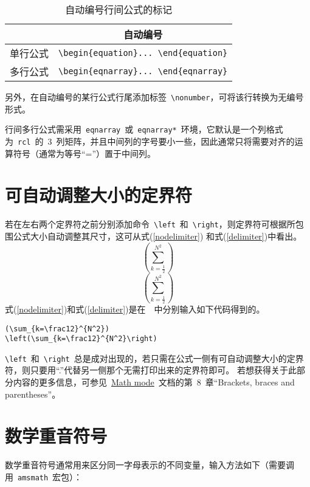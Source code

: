 \begin{table}[htbp]
\caption{自动编号行间公式的标记}\label{tab:eqtag_2}
\vspace{0.5em}\centering\wuhao
\begin{tabularx}{\textwidth}{cc}
\toprule
& 自动编号\\
\midrule
单行公式 & \verb|\begin{equation}... \end{equation}|\\
多行公式 & \verb|\begin{eqnarray}... \end{eqnarray}|\\
\bottomrule
\end{tabularx}
\end{table}

另外，在自动编号的某行公式行尾添加标签~\verb|\nonumber|，可将该行转换为无编号形式。

行间多行公式需采用~\verb|eqnarray|~或~\verb|eqnarray*|~环境，它默认是一个列格式为~\verb|rcl|~的~3~列矩阵，并且中间列的字号要小一些，因此通常只将需要对齐的运算符号（通常为等号“=”）置于中间列。

\section{可自动调整大小的定界符}

若在左右两个定界符之前分别添加命令~\verb|\left|~和~\verb|\right|，则定界符可根据所包围公式大小自动调整其尺寸，这可从式(\ref{nodelimiter}) 和式(\ref{delimiter})中看出。
\begin{equation}\label{nodelimiter}
(\sum_{k=\frac12}^{N^2})
\end{equation}
\begin{equation}\label{delimiter}
\left(\sum_{k=\frac12}^{N^2}\right)
\end{equation}
式(\ref{nodelimiter})和式(\ref{delimiter})是在~\XeLaTeX~中分别输入如下代码得到的。
\begin{verbatim}
(\sum_{k=\frac12}^{N^2})
\left(\sum_{k=\frac12}^{N^2}\right)
\end{verbatim}
\verb|\left|~和~\verb|\right|~总是成对出现的，若只需在公式一侧有可自动调整大小的定界符，则只要用“.”代替另一侧那个无需打印出来的定界符即可。
若想获得关于此部分内容的更多信息，可参见~\href{http://tug.ctan.org/cgi-bin/ctanPackageInformation.py?id=voss-mathmode}{Math mode}~文档的第~8~章“Brackets, braces and parentheses”。

\section{数学重音符号}
数学重音符号通常用来区分同一字母表示的不同变量，输入方法如下（需要调用~\verb|amsmath|~宏包）：

